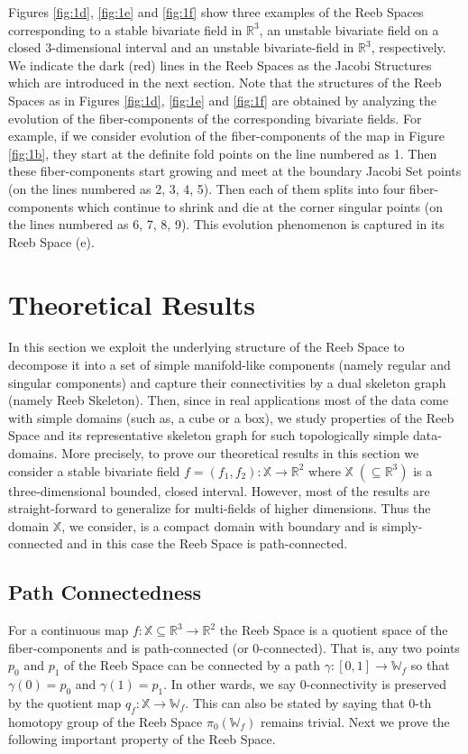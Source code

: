\documentclass[twocolumn]{article}
\newcommand{\X}{\mathbb{X}}
\newcommand{\R}{\mathbb{R}}
\newcommand{\RS}{\mathbb{W}_f}
\newcommand{\figref}[1]{Figure \ref{fig:#1}}
\newcommand{\threefigref}[3]{Figures \ref{fig:#1}, \ref{fig:#2} and \ref{fig:#3}}
\begin{document}
\threefigref{1d}{1e}{1f} show three examples of the Reeb Spaces
corresponding to a stable bivariate
field in $\R^3$, an unstable bivariate field on a closed 3-dimensional interval
and an unstable bivariate-field in $\R^3$, 
respectively. We indicate the dark (red) lines in the Reeb Spaces as the Jacobi Structures which are introduced in the next section.
Note that the structures of
the Reeb Spaces as in \threefigref{1d}{1e}{1f} are obtained by analyzing the evolution of the
fiber-components of the corresponding bivariate fields. For example, if we consider evolution
of the fiber-components of the map in \figref{1b}, 
they start at the definite fold points on the line numbered as 1.
Then these fiber-components start growing and meet at the boundary
Jacobi Set points (on the lines numbered as 2, 3, 4, 5). 
Then each of them splits into four fiber-components which continue to shrink 
and die at the corner singular points (on the lines numbered as 6, 7,
8, 9). This evolution phenomenon is captured in its Reeb Space (e). 
%
 \section{Theoretical Results}
\label{sec:Theory}
In this section we exploit the underlying structure of the Reeb Space
to decompose it into a set of simple manifold-like components (namely
regular and singular components) and capture 
their connectivities by a dual skeleton graph (namely Reeb Skeleton).
Then, since in real applications most of the data come with simple
domains (such as, a cube or a box), we study properties of the Reeb Space and its representative skeleton graph
for such topologically simple data-domains. More precisely, to prove our 
theoretical results in this section we consider a stable bivariate
field $f=(f_1,f_2):\X\rightarrow\R^2$ where $\X\; (\subseteq\R^3)$ is a
three-dimensional bounded, closed interval. 
However, most of the results
are straight-forward to generalize for multi-fields of  
higher dimensions. Thus the domain $\X$, we consider, is a compact domain with
boundary and is simply-connected and in this case 
the Reeb Space is path-connected.

\subsection{Path Connectedness}
For a continuous map $f: \mathbb{X}\subseteq \mathbb{R}^3\rightarrow
\mathbb{R}^2$ the Reeb Space is a quotient space of the
fiber-components and is path-connected (or $0$-connected). That is, any two points $p_0$ and $p_1$ of the
Reeb Space can be connected by a path $\gamma: [0,1]\rightarrow \RS$
so that $\gamma(0)=p_0$ and $\gamma(1)=p_1$. In other wards, we say $0$-connectivity is
preserved by the quotient map $q_f: \mathbb{X} \rightarrow \RS$. This can also be stated by
saying that $0$-th homotopy group of the Reeb Space $\pi_0(\RS)$ remains trivial.
Next we prove the following important property of the Reeb Space.
\end{document}
